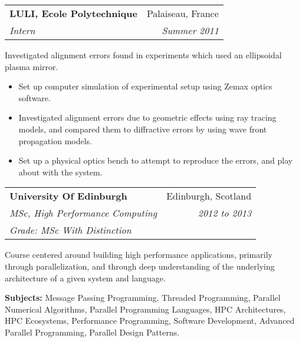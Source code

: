 \documentclass[11pt]{article}
\makeatletter
\newcommand{\resumeSection}[1]{
    \par
    \vspace{\baselineskip}
    \large {\sc {#1}}
    \par
    \vspace{-0.9\baselineskip}
    \hrulefill
    \vspace{0.5\baselineskip}
    \par
}
\newenvironment{resumeSubSectionHeader}{
    \par
    \begin{tabular*}{\textwidth}{l@{\extracolsep{\fill}}r}
    \par
} {
    \end{tabular*}
    \par
}
\newenvironment{resumeSubSectionBody}{
    \par
    \vspace{-0.8\parskip}
    \begin{small}
    \par
} {
    \par
    \end{small}
    \par
}
\makeatother
\begin{document}
%
%
\begin{resumeSubSectionHeader}

    \textbf{LULI, Ecole Polytechnique} & Palaiseau, France \\
    \emph{Intern}                      & \emph{Summer 2011}

\end{resumeSubSectionHeader}
\begin{resumeSubSectionBody}

    Investigated alignment errors found in experiments which used an
    ellipsoidal plasma mirror.

    \begin{itemize}
        \item
            Set up computer simulation of experimental setup using
            Zemax optics software.

        \item
            Investigated alignment errors due to geometric effects
            using ray tracing models, and compared them
            to diffractive errors by using wave front propagation models.

        \item
            Set up a physical optics bench to attempt to reproduce the
            errors, and play about with the system.
    \end{itemize}

\end{resumeSubSectionBody}




\resumeSection{Education \& Training}


%
%
\begin{resumeSubSectionHeader}

    \textbf{University Of Edinburgh}       & Edinburgh, Scotland\\
    \emph{MSc, High Performance Computing} & \emph{2012 to 2013} \\
    \emph{Grade: MSc With Distinction}

\end{resumeSubSectionHeader}
\begin{resumeSubSectionBody}

    Course centered around building high performance applications,
    primarily through parallelization, and through deep understanding
    of the underlying architecture of a given system and language.

    \begin{description}
        \item{\bf Subjects:}
            Message Passing Programming, Threaded Programming,
            Parallel Numerical Algorithms,
            Parallel Programming Languages, HPC Architectures,
            HPC Ecosystems, Performance Programming,
            Software Development, Advanced Parallel Programming,
            Parallel Design Patterns.
    \end{description}

\end{resumeSubSectionBody}
\end{document}
